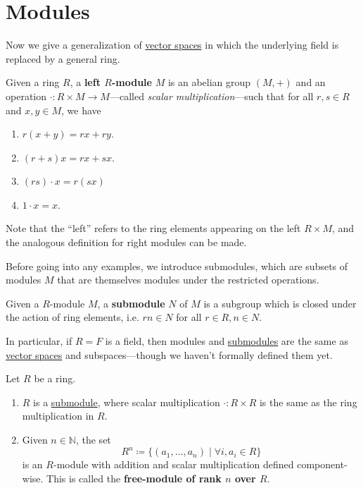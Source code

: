 \section{Modules} 

  Now we give a generalization of \hyperref[st-def:vector-space]{vector spaces} in which the underlying field is replaced by a general ring. 

  \begin{definition}[Module]
    \label{def:module}
    Given a ring $R$, a \textbf{left $R$-module} $M$ is an abelian group $(M, +)$ and an operation $\cdot: R \times M \to M$---called \textit{scalar multiplication}---such that for all $r, s \in R$ and $x, y \in M$, we have 
    \begin{enumerate}
      \item $r (x + y) = rx + ry$. 
      \item $(r + s) x = rx + sx$. 
      \item $(rs) \cdot x = r(sx)$ 
      \item $1 \cdot x = x$. 
    \end{enumerate}
    Note that the ``left'' refers to the ring elements appearing on the left $R \times M$, and the analogous definition for right modules can be made. 
  \end{definition}

  Before going into any examples, we introduce submodules, which are subsets of modules $M$ that are themselves modules under the restricted operations. 

  \begin{definition}[Submodule]
    \label{def:submodule}
    Given a $R$-module $M$, a \textbf{submodule} $N$ of $M$ is a subgroup which is closed under the action of ring elements, i.e. $rn \in N$ for all $r \in R, n \in N$. 
  \end{definition}

  In particular, if $R = F$ is a field, then modules and \hyperref[def:submodule]{submodules} are the same as \hyperref[st-def:vector-space]{vector spaces} and subspaces---though we haven't formally defined them yet. 

  \begin{example}[Modules]
    \label{ex:modules}
    Let $R$ be a ring. 
    \begin{enumerate}
      \item $R$ is a \hyperref[def:submodule]{submodule}, where scalar multiplication $\cdot : R \times R$ is the same as the ring multiplication in $R$. 
      \item Given $n \in \mathbb{N}$, the set 
        \begin{equation}
          R^n \coloneqq \{(a_1, \ldots, a_n) \mid \forall i, a_i \in R \} 
        \end{equation}
        is an $R$-module with addition and scalar multiplication defined component-wise. This is called the \textbf{free-module of rank $n$ over $R$}. 
    \end{enumerate}
  \end{example}

